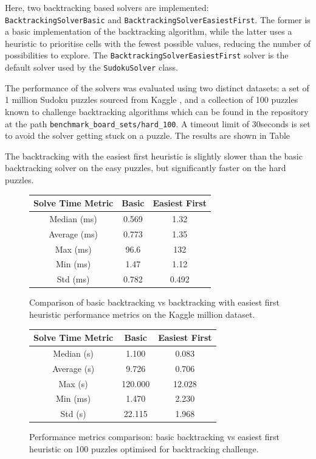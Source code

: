 \documentclass[11pt]{article}
\begin{document}
Here, two backtracking based solvers are implemented: \texttt{BacktrackingSolverBasic} and \texttt{BacktrackingSolverEasiestFirst}. The former is a basic implementation of the backtracking algorithm, while the latter uses a heuristic to prioritise cells with the fewest possible values, reducing the number of possibilities to explore. The \texttt{BacktrackingSolverEasiestFirst} solver is the default solver used by the \texttt{SudokuSolver} class.

The performance of the solvers was evaluated using two distinct datasets: a set of 1 million Sudoku puzzles sourced from Kaggle \cite{kaggleDataset}, and a collection of 100 puzzles known to challenge backtracking algorithms which can be found in the repository at the path \texttt{benchmark\_board\_sets/hard\_100}. A timeout limit of 30seconds is set to avoid the solver getting stuck on a puzzle. The results are shown in Table 

The backtracking with the easiest first heuristic is slightly slower than the basic backtracking solver on the easy puzzles, but significantly faster on the hard puzzles. 
\begin{figure}[h!]
    \centering
    \begin{tabular}{|c|c|c|}
    \hline
    Solve Time Metric & Basic & Easiest First \\
    \hline
    Median (ms) & 0.569 & 1.32 \\
    \hline
    Average (ms) & 0.773 & 1.35 \\
    \hline
    Max (ms) & 96.6 & 132 \\
    \hline
    Min (ms) & 1.47 & 1.12 \\
    \hline
    Std (ms) & 0.782 & 0.492 \\
    \hline
    \end{tabular}
    \caption{Comparison of basic backtracking vs backtracking with easiest first heuristic performance metrics on the Kaggle million dataset.}
\end{figure}

\begin{figure}[h!]
    \centering
    \begin{tabular}{|c|c|c|}
    \hline
    Solve Time Metric & Basic & Easiest First \\
    \hline
    Median (s) & 1.100 & 0.083 \\
    \hline
    Average (s) & 9.726 & 0.706 \\
    \hline
    Max (s) & 120.000 & 12.028 \\
    \hline
    Min (ms) & 1.470 & 2.230 \\
    \hline
    Std (s) & 22.115 & 1.968 \\
    \hline
    \end{tabular}
    \caption{Performance metrics comparison: basic backtracking vs easiest first heuristic on 100 puzzles optimised for backtracking challenge.}


\end{figure}
\end{document}

